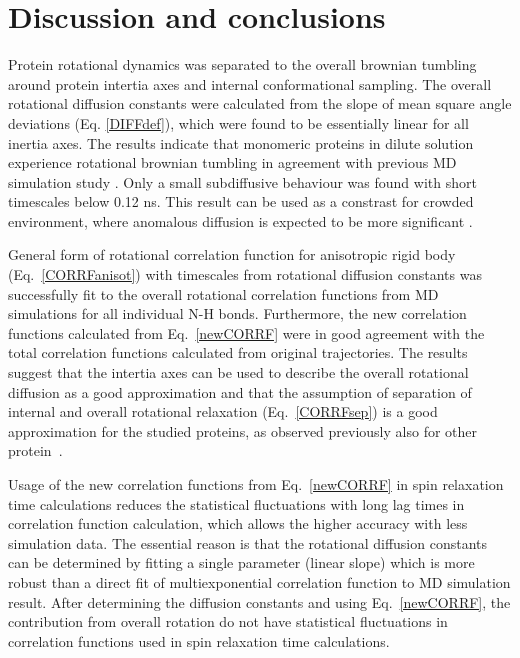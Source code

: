 \documentclass[pre,aps,floatfix,authordate1-4,twocolumn]{revtex4-1}
\begin{document}
\section{Discussion and conclusions}
Protein rotational dynamics was separated to the overall
brownian tumbling around protein intertia axes and internal
conformational sampling. The overall rotational diffusion constants
were calculated from the slope of mean square angle deviations (Eq. \ref{DIFFdef}),
which were found to be essentially linear for all inertia axes.
The results indicate that monomeric proteins in dilute solution
experience rotational brownian tumbling in agreement with previous
MD simulation study \cite{wong08}. Only a small subdiffusive behaviour
was found with short timescales below 0.12 ns. This result can be used as a constrast
for crowded environment, where anomalous diffusion is expected to
be more significant \cite{hofling13}.

General form of rotational correlation function for anisotropic rigid body
(Eq.~\ref{CORRFanisot}) with timescales from rotational diffusion constants
was successfully fit to the overall rotational correlation functions from
MD simulations for all individual N-H bonds. Furthermore, the new correlation
functions calculated from Eq.~\ref{newCORRF} were in good agreement with
the total correlation functions calculated from original trajectories.
The results suggest that the intertia axes can be used to describe
the overall rotational diffusion as a good approximation and that
the assumption of separation of internal and overall rotational
relaxation (Eq.~\ref{CORRFsep}) is a good approximation for the studied
proteins, as observed previously also for other protein~\cite{wong08,allner15}.

Usage of the new correlation functions from Eq.~\ref{newCORRF} in
spin relaxation time calculations reduces the statistical fluctuations
with long lag times in correlation function calculation,
which allows the higher accuracy with less simulation data.
The essential reason is that the rotational diffusion constants
can be determined by fitting a single parameter (linear slope) which is
more robust than a direct fit of multiexponential correlation function
to MD simulation result. After determining
the diffusion constants and using Eq.~\ref{newCORRF},
the contribution from overall rotation do not have statistical
fluctuations in correlation functions used in spin relaxation time calculations.
\end{document}
